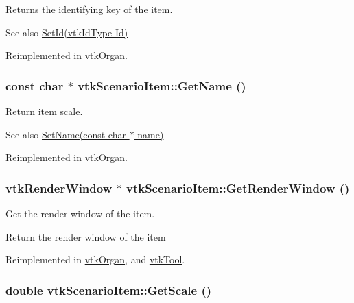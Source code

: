 Returns the identifying key of the item. 

\begin{DoxySeeAlso}{See also}
\hyperlink{classvtkScenarioItem_afd99a6db7187837d0129e9898478ec60}{SetId(vtkIdType Id)} 
\end{DoxySeeAlso}


Reimplemented in \hyperlink{classvtkOrgan_a8e45f79da9c4e7029492ced2f55c25ed}{vtkOrgan}.

\hypertarget{classvtkScenarioItem_a41ebb204b2879d9dd14a392c1cb3c2fe}{
\subsubsection[{GetName}]{\setlength{\rightskip}{0pt plus 5cm}const char $\ast$ vtkScenarioItem::GetName ()}}
\label{classvtkScenarioItem_a41ebb204b2879d9dd14a392c1cb3c2fe}


Return item scale. 

\begin{DoxySeeAlso}{See also}
\hyperlink{classvtkScenarioItem_a199f87511e99386bb9f271d91c2d0caf}{SetName(const char $\ast$ name)} 
\end{DoxySeeAlso}


Reimplemented in \hyperlink{classvtkOrgan_a8421389b02b00b42b0899b75d00633b4}{vtkOrgan}.

\hypertarget{classvtkScenarioItem_a9d7908b11d2a477827342c05bb505e66}{
\subsubsection[{GetRenderWindow}]{\setlength{\rightskip}{0pt plus 5cm}vtkRenderWindow $\ast$ vtkScenarioItem::GetRenderWindow ()}}
\label{classvtkScenarioItem_a9d7908b11d2a477827342c05bb505e66}


Get the render window of the item. 

Return the render window of the item 

Reimplemented in \hyperlink{classvtkOrgan_ae670e2727313073a9659a2795ce64c98}{vtkOrgan}, and \hyperlink{classvtkTool_ab156b5e1d4a9974b6b4a9809fdb10dc1}{vtkTool}.

\hypertarget{classvtkScenarioItem_a136a346d222abe59fd63b2f4ced9b3fa}{
\subsubsection[{GetScale}]{\setlength{\rightskip}{0pt plus 5cm}double vtkScenarioItem::GetScale ()}}
\label{classvtkScenarioItem_a136a346d222abe59fd63b2f4ced9b3fa}


